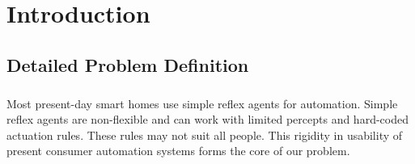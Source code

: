 \chapter{Introduction}

\begin{comment}

\section{Background and Recent Research}
\subsection{<any sub section here>}

\subsection{Literature Survey}

\subsubsection{<Sub-subsection title>}
some text\cite{citation-1-name-here}, some more text

\subsubsection{<Sub-subsection title>}
even more text\footnote{<footnote here>}, and even more.

\section{Motivation}

\end{comment}

\section{Detailed Problem Definition}
\paragraph{}
Most present-day smart homes use simple reflex agents for automation. Simple reflex agents are non-flexible and can work with limited percepts and hard-coded actuation rules. These rules may not suit all people. This rigidity in usability of present consumer automation systems forms the core of our problem.

